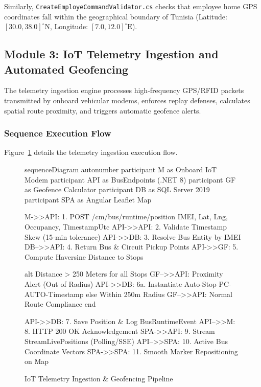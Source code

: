 Similarly, \texttt{CreateEmployeCommandValidator.cs} checks that employee home GPS coordinates fall within the geographical boundary of Tunisia (Latitude: $[30.0, 38.0]^\circ\text{N}$, Longitude: $[7.0, 12.0]^\circ\text{E}$).

\subsection{Module 3: IoT Telemetry Ingestion and Automated Geofencing}
\label{sec:impl_telemetry_geofence}

The telemetry ingestion engine processes high-frequency GPS/RFID packets transmitted by onboard vehicular modems, enforces replay defenses, calculates spatial route proximity, and triggers automatic geofence alerts.

\subsubsection{Sequence Execution Flow}
Figure~\ref{fig:seq_telemetry} details the telemetry ingestion execution flow.

\begin{figure}[H]
  \centering
  \begin{mermaid}[width=0.98\textwidth]
sequenceDiagram
    autonumber
    participant M as Onboard IoT Modem
    participant API as BusEndpoints (.NET 8)
    participant GF as Geofence Calculator
    participant DB as SQL Server 2019
    participant SPA as Angular Leaflet Map
    
    M->>API: 1. POST /cm/bus/runtime/position {IMEI, Lat, Lng, Occupancy, TimestampUtc}
    API->>API: 2. Validate Timestamp Skew (15-min tolerance)
    API->>DB: 3. Resolve Bus Entity by IMEI
    DB-->>API: 4. Return Bus & Circuit Pickup Points
    API->>GF: 5. Compute Haversine Distance to Stops
    
    alt Distance > 250 Meters for all Stops
        GF-->>API: Proximity Alert (Out of Radius)
        API->>DB: 6a. Instantiate Auto-Stop PC-AUTO-{Timestamp}
    else Within 250m Radius
        GF-->>API: Normal Route Compliance
    end
    
    API->>DB: 7. Save Position & Log BusRuntimeEvent
    API-->>M: 8. HTTP 200 OK Acknowledgement
    SPA->>API: 9. Stream StreamLivePositions (Polling/SSE)
    API-->>SPA: 10. Active Bus Coordinate Vectors
    SPA->>SPA: 11. Smooth Marker Repositioning on Map
  \end{mermaid}
  \caption{IoT Telemetry Ingestion \& Geofencing Pipeline}
  \label{fig:seq_telemetry}
\end{figure}

